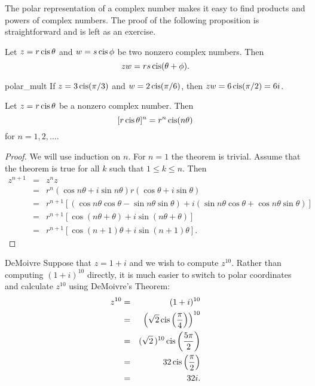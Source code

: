  
The polar representation of a complex number makes it easy to find
products and powers of complex numbers.  The proof of the following
proposition is straightforward and is left as an exercise.
 
 
\begin{proposition}\label{polar_mult}
Let $z = r \operatorname{cis} \theta$ and $w = s \operatorname{cis} \phi$
be two nonzero complex numbers. Then 
\[
zw = r s \operatorname{cis}( \theta + \phi).
\]
\end{proposition}
 
 
\begin{example}{polar_mult}
If $z =  3 \operatorname{cis}( \pi / 3 )$ and $w = 2 \operatorname{cis}(\pi / 6 )$, then $zw = 6
\operatorname{cis}( \pi / 2 ) = 6i$.  
\end{example}
 
 
\begin{theorem}[DeMoivre]
Let $z = r \operatorname{cis}  \theta$ be a nonzero complex number. Then 
\[
[r \operatorname{cis} \theta  ]^n
=
r^n \operatorname{cis}( n \theta)
\]
for $n = 1, 2, \ldots$.
\end{theorem}
 
 
\begin{proof}
We will use induction on $n$. For $n = 1$ the theorem is trivial.
Assume that the theorem is true for all $k$ such that $1  \leq k \leq
n$. Then 
\begin{eqnarray*}
z^{n+1} & = & z^n z \\
& = &
r^n( \cos  n \theta + i \sin n \theta ) r( \cos \theta + i
\sin \theta ) \\
& = &
r^{n+1} [( \cos n \theta \cos \theta - \sin n \theta \sin
\theta )
 + i ( \sin n \theta \cos \theta + \cos n \theta \sin \theta
)] \\
& = &
r^{n+1} [ \cos( n \theta + \theta) + i \sin( n \theta +
\theta) ] \\
& = &
r^{n+1} [ \cos( n +1) \theta + i \sin( n+1) \theta  ].
\end{eqnarray*}
\end{proof}
 
 
\begin{example}{DeMoivre}
Suppose that $z= 1+i$ and we wish to compute $z^{10}$. Rather than
computing $(1+i)^{10}$ directly, it is much easier to switch to polar
coordinates and calculate $z^{10}$ using DeMoivre's Theorem:
\begin{eqnarray*}
z^{10}
& = &
(1+i)^{10} \\
& = &
\left( \sqrt{2} \operatorname{cis} \left( \frac{\pi }{4} \right)
\right)^{10} \\
& = &
( \sqrt{2}\, )^{10} \operatorname{cis} \left( \frac{5\pi }{2} \right)
\\
& = &
32  \operatorname{cis} \left( \frac{\pi }{2} \right) \\
& = & 32i.
\end{eqnarray*}
\end{example}
 
